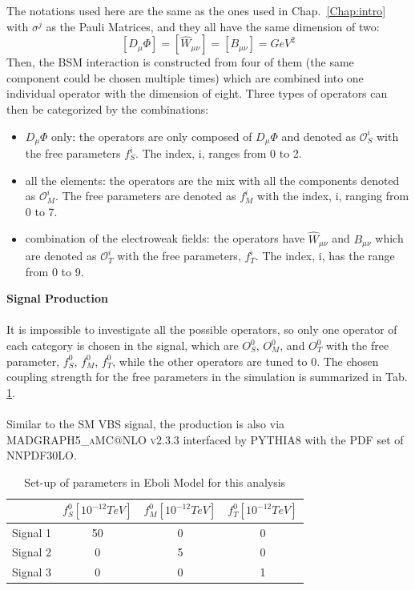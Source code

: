 The notations used here are the same as the ones used in Chap.~\ref{Chap:intro} with $\sigma^j$ as the Pauli Matrices, and they all have the same dimension of two:
\begin{equation}
\left[D_{\mu}\Phi\right]=\left[\hat{W}_{\mu\nu}\right]=\left[B_{\mu\nu}\right]= GeV^2
\end{equation}
Then, the BSM interaction is constructed from four of them (the same component could be chosen multiple times) which are combined into one individual operator with the dimension of eight. Three types of operators can then be categorized by the combinations:
\begin{itemize}
    \item{$D_\mu\Phi$ only}: the operators are only composed of $D_\mu\Phi$ and denoted as $\mathcal{O}^i_S$ with the free parameters $f^i_{S}$. The index, i, ranges from 0 to 2.  
    \item{all the elements}: the operators are the mix with all the components denoted as  $\mathcal{O}^i_M$. The free parameters are denoted as $f^i_{M}$ with the index, i, ranging from 0 to 7.
    \item{combination of the electroweak fields}: the operators have $\hat{W}_{\mu\nu}$ and $B_{\mu\nu}$ which are denoted as $\mathcal{O}_{T}^i$ with the free parameters, $f_T^i$. The index, i, has the range from 0 to 9. 
\end{itemize}
\noindent
{\bf Signal Production}
\\
\\It is impossible to investigate all the possible operators, so only one operator of each category is chosen in the signal, which are $O_{S}^0$, $O_{M}^0$, and $O_{T}^0$ with the free parameter, $f^0_{S}$, $f^0_{M}$,  $f_T^0$, while the other operators are tuned to 0.  The chosen coupling strength for the free parameters in the simulation is summarized in Tab. \ref{Tab:Eboli}.
\\
\\Similar to the SM VBS signal, the production is also via \textsc{MADGRAPH5\_aMC@NLO v2.3.3}\cite{Alwall:2014hca} interfaced by \textsc{PYTHIA8}\cite{Sjostrand:2007gs} with the PDF set of NNPDF30LO\cite{Ball:2012cx}. 
\begin{table}[h]
	\caption{Set-up of parameters in Eboli Model for this analysis} \label{Tab:Eboli}
	\begin{center}
		\begin{tabular}{ | c | c | c | c | }
		\hline
			     &   $f^0_{S}\left[10^{-12}TeV\right]$  & $f^0_{M}\left[10^{-12}TeV\right]$ & $f^0_{T}\left[10^{-12}TeV\right]$ \\
	    \hline
	    Signal 1 &        50                            & 0                                & 0 \\
	    \hline
		Signal 2 &        0                             & 5                                & 0 \\
		\hline
		Signal 3 &        0                             & 0                                & 1 \\
		\hline
		\end{tabular}
	\end{center}
\end{table}
